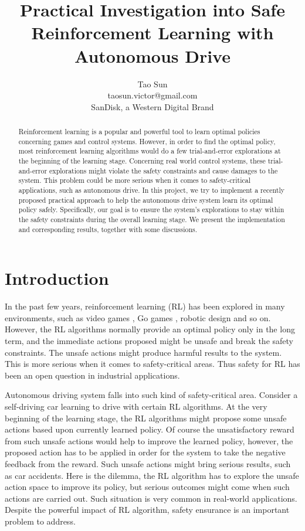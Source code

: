 \documentclass{article} %
\title{Practical Investigation into Safe Reinforcement Learning with Autonomous Drive}
\author{Tao Sun \\
taosun.victor@gmail.com \\
SanDisk, a Western Digital Brand  
}
\begin{document}
\maketitle

\begin{abstract}
Reinforcement learning is a popular and powerful tool to learn optimal policies concerning games and control systems. However, in order to find the optimal policy, most reinforcement learning algorithms would do a few trial-and-error explorations at the beginning of the learning stage. Concerning real world control systems, these trial-and-error explorations might violate the safety constraints and cause damages to the system. This problem could be more serious when it comes to safety-critical applications, such as autonomous drive. In this project, we try to implement a recently proposed practical approach to help the autonomous drive system learn its optimal policy safely. Specifically, our goal is to ensure the system's explorations to stay within the safety constraints during the overall learning stage. We present the implementation and corresponding results, together with some discussions.
\end{abstract}

\section{Introduction}
In the past few years, reinforcement learning (RL) has been explored in many environments, such as video games \cite{mnih2015human}, Go games \cite{silver2016mastering}, robotic design \cite{kober2013reinforcement} and so on. However, the RL algorithms normally provide an optimal policy only in the long term, and the immediate actions proposed might be unsafe and break the safety constraints. The unsafe actions might produce harmful results to the system. This is more serious when it comes to safety-critical areas. Thus safety for RL has been an open question in industrial applications.

Autonomous driving system falls into such kind of safety-critical area. Consider a self-driving car learning to drive with certain RL algorithms. At the very beginning of the learning stage, the RL algorithms might propose some unsafe actions based upon currently learned policy. Of course the unsatisfactory reward from such unsafe actions would help to improve the learned policy, however, the proposed action has to be applied in order for the system to take the negative feedback from the reward. Such unsafe actions might bring serious results, such as car accidents. Here is the dilemma, the RL algorithm has to explore the unsafe action space to improve its policy, but serious outcomes might come when such actions are carried out. Such situation is very common in real-world applications. Despite the powerful impact of RL algorithm, safety ensurance is an important problem to address. 
\end{document}
